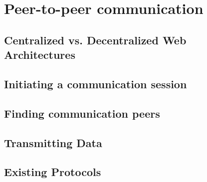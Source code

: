 
\section{Peer-to-peer communication}
\label{sec:p2p_communication}

\subsection{Centralized vs. Decentralized Web Architectures}
\label{sec:central_decentral_arch}


\subsection{Initiating a communication session}
\label{sec:p2p_init_session}


\subsection{Finding communication peers}
\label{sec:p2p_finding_peers}


\subsection{Transmitting Data}
\label{sec:p2p_data_transmit}


\subsection{Existing Protocols}
\label{sec:p2p_protocols}


